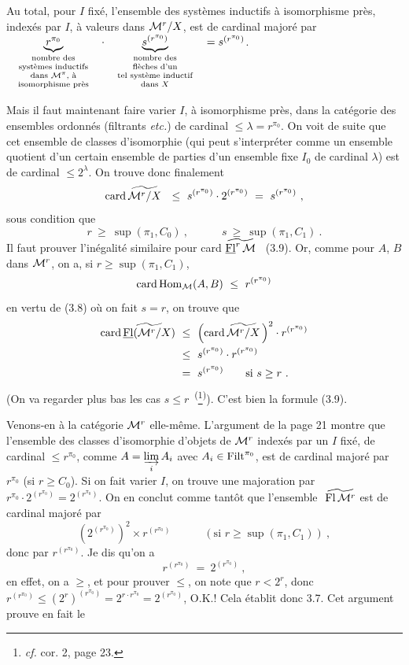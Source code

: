 Au total, pour $I$ fixé, l'ensemble des systèmes inductifs à isomorphisme près, indexés par $I$, à valeurs dans $\mathcal{M}^r/X$, est  de cardinal majoré par $\quad\underbrace{r^{\pi_0}}_{\text{\scriptsize\begin{tabular}{@{}c@{}}nombre des\\ systèmes inductifs\\ dans $\M^\pi$, à\\ isomorphisme près\end{tabular}}}\quad\cdot\quad\underbrace{s^{(r^{\pi_0})}}_{\text{\scriptsize\begin{tabular}{@{}c@{}}nombre des\\ flèches d'un\\ tel système inductif\\ dans $X$\end{tabular}}}\quad=s^{(r^{\pi_0})}$.

Mais il faut maintenant faire varier $I$, à isomorphisme près, dans la catégorie des ensembles ordonnés (filtrants \textit{etc.}) de cardinal $\leq\lambda=r^{\pi_0}$. On voit de suite que cet ensemble de classes d'isomorphie (qui peut s'interpréter comme un ensemble quotient d'un certain ensemble de parties d'un ensemble fixe $I_0$ de cardinal $\lambda$) est de cardinal $\leq 2^\lambda$. On trouve donc finalement
\[
\operatorname{card}\widetilde{\mathcal{M}^r/X}\ \ \leq\ s^{(r^{\pi_0})}\cdot 2^{(r^{\pi_0})}\ =\ s^{(r^{\pi_0})}\ ,
\]
sous condition que
\[
r\ \geq\ \sup(\pi_1,C_0)\ ,\qquad\quad s\ \geq\ \sup(\pi_1,C_1)\ .
\]
Il faut prouver l'inégalité similaire pour card $\widetilde{\underline{\mathrm{Fl}}^r\,\mathcal{M}}$ \ (3.9). Or, comme pour $A$, $B$ dans $\mathcal{M}^r$, on a, si $r\geq\sup(\pi_1,C_1)$,
\[
\card\Hom_{\M}(A,B)\ \leq\ r^{(r^{\pi_0})}
\]
en vertu de (3.8) où on fait $s=r$, on trouve que
\[
\begin{aligned}
\card\wavy{\uFl(\M^r/X)}\ &\leq\ \Bigl(\card\wavy{\M^r/X}\,\Bigr)^2\cdot r^{(r^{\pi_0})}\\
&\leq\ s^{(r^{\pi_0})}\cdot r^{(r^{\pi_0})}\\
&=\ s^{(r^{\pi_0})}\qquad\text{si } s\geq r\ .
\end{aligned}
\]
(On va regarder plus bas les cas $s\leq r$~\textsuperscript{(}\footnote[8]{\textit{cf.} cor. 2, page 23.}\textsuperscript{)}). C'est bien la formule (3.9).

Venons-en à la catégorie $\mathcal{M}^r$ elle-même. L'argument de la page 21 montre que l'ensemble des classes d'isomorphie d'objets de $\mathcal{M}^r$ indexés par un $I$ fixé, de cardinal $\leq r^{\pi_0}$, comme $A=\varinjlim\limits_i A_i$ avec $A_i\in\mathrm{Filt}^{\pi_0}$, est de cardinal majoré par $r^{\pi_0}$ (si $r\geq C_0$). Si on fait varier $I$, on trouve une majoration par $r^{\pi_0}\cdot 2^{(r^{\pi_0})}=2^{(r^{\pi_0})}$. On en conclut comme tantôt que l'ensemble $\ \wavy{\Fl\,\M^r}$ est de cardinal majoré par
\[
(2^{(r^{\pi_0})})^2\times r^{(r^{\pi_0})}\qquad\quad(\text{si } r\geq\sup(\pi_1,C_1))\ ,
\]
donc par $r^{(r^{\pi_0})}$. Je dis qu'on a
\[
r^{(r^{\pi_0})}\ =\ 2^{(r^{\pi_0})}\ ,
\]
en effet, on a $\geq$, et pour prouver $\leq$, on note que $r<2^r$, donc $r^{(r^{\pi_0})}\leq(2^r)^{(r^{\pi_0})}=2^{r\cdot r^{\pi_0}}=2^{(r^{\pi_0})}$, O.K.! Cela établit donc 3.7. Cet argument prouve en fait le

